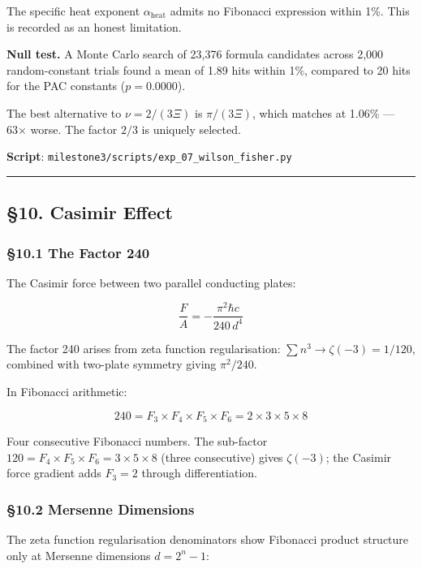 \documentclass[
  11pt,
  a4paper]{article}
\begin{document}
The specific heat exponent \(\alpha_{\text{heat}}\) admits no Fibonacci
expression within 1\%. This is recorded as an honest limitation.

\textbf{Null test.} A Monte Carlo search of 23,376 formula candidates
across 2,000 random-constant trials found a mean of 1.89 hits within
1\%, compared to 20 hits for the PAC constants (\(p = 0.0000\)).

The best alternative to \(\nu = 2/(3\Xi)\) is \(\pi/(3\Xi)\), which
matches at 1.06\% --- 63× worse. The factor \(2/3\) is uniquely
selected.

\textbf{Script}: \texttt{milestone3/scripts/exp\_07\_wilson\_fisher.py}

\begin{center}\rule{0.5\linewidth}{0.5pt}\end{center}

\subsection{§10. Casimir Effect}\label{casimir-effect}

\subsubsection{§10.1 The Factor 240}\label{the-factor-240}

The Casimir force between two parallel conducting plates:

\[\frac{F}{A} = -\frac{\pi^2 \hbar c}{240\,d^4}\]

The factor 240 arises from zeta function regularisation:
\(\sum n^3 \to \zeta(-3) = 1/120\), combined with two-plate symmetry
giving \(\pi^2/240\).

In Fibonacci arithmetic:

\[240 = F_3 \times F_4 \times F_5 \times F_6 = 2 \times 3 \times 5 \times 8\]

Four consecutive Fibonacci numbers. The sub-factor
\(120 = F_4 \times F_5 \times F_6 = 3 \times 5 \times 8\) (three
consecutive) gives \(\zeta(-3)\); the Casimir force gradient adds
\(F_3 = 2\) through differentiation.

\subsubsection{§10.2 Mersenne Dimensions}\label{mersenne-dimensions}

The zeta function regularisation denominators show Fibonacci product
structure only at Mersenne dimensions \(d = 2^n - 1\):
\end{document}
